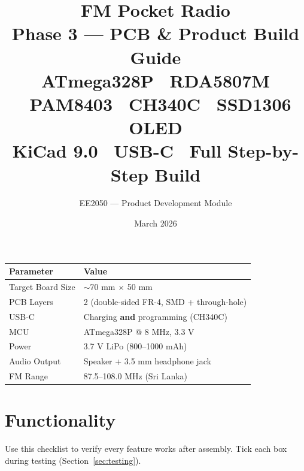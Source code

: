 \documentclass[a4paper,11pt]{article}
\title{
    \vspace{-0.5cm}
    {\sffamily\fontsize{36}{40}\selectfont\bfseries\color{accentblue} FM Pocket Radio}\\[0.4cm]
    {\sffamily\Large\color{accentteal} Phase 3 --- PCB \& Product Build Guide}\\[0.3cm]
    {\sffamily\normalsize\color{codegray} ATmega328P \textbullet\ RDA5807M \textbullet\ PAM8403 \textbullet\ CH340C \textbullet\ SSD1306 OLED}\\[0.15cm]
    {\sffamily\small\color{codegray} KiCad 9.0 \textbullet\ USB-C \textbullet\ Full Step-by-Step Build}
}
\author{\sffamily\large EE2050 --- Product Development Module}
\date{\sffamily\normalsize March 2026}
\renewcommand*{\,}{ }%
\begin{document}
\maketitle
\thispagestyle{empty}
\vfill
\begin{center}
{\sffamily\small
\begin{tabular}{@{}lp{8cm}@{}}
\toprule
\rowcolor{tabhead}
\textbf{Parameter} & \textbf{Value} \\
\midrule
Target Board Size & $\sim$70\,mm $\times$ 50\,mm \\
PCB Layers & 2 (double-sided FR-4, SMD + through-hole) \\
USB-C & Charging \textbf{and} programming (CH340C) \\
MCU & ATmega328P @ 8\,MHz, 3.3\,V \\
Power & 3.7\,V LiPo (800--1000\,mAh) \\
Audio Output & Speaker + 3.5\,mm headphone jack \\
FM Range & 87.5--108.0\,MHz (Sri Lanka) \\
\bottomrule
\end{tabular}
}
\end{center}
\vfill
\newpage

\tableofcontents
\newpage

\section{Functionality}
\label{sec:functionality}

Use this checklist to verify every feature works after assembly. Tick each box during testing (Section~\ref{sec:testing}).
\end{document}
